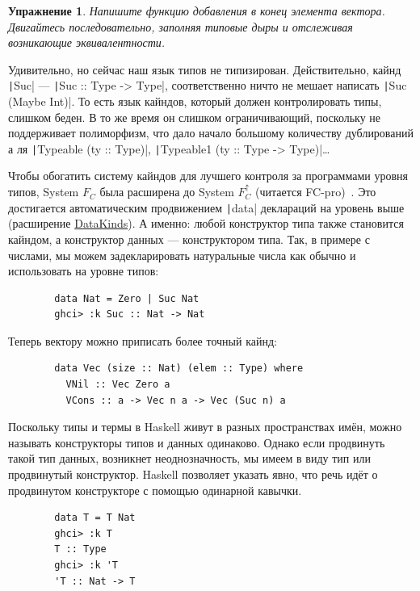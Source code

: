 \documentclass[12pt]{article}
\newtheorem{task}{Упражнение}
\begin{document}
    \begin{task}
        Напишите функцию добавления в конец элемента вектора.
        Двигайтесь последовательно, заполняя типовые дыры и отслеживая возникающие эквивалентности.
    \end{task}

    Удивительно, но сейчас наш язык типов не типизирован.
    Действительно, кайнд \texttt|Suc| --- \texttt|Suc :: Type -> Type|, соответственно ничто не мешает написать \texttt|Suc (Maybe Int)|.
    То есть язык кайндов, который должен контролировать типы, слишком беден.
    В то же время он слишком ограничивающий, поскольку не поддерживает полиморфизм, что дало начало большому количеству дублирований а ля \texttt|Typeable (ty :: Type)|, \texttt|Typeable1 (ty :: Type -> Type)|\ldots

    Чтобы обогатить систему кайндов для лучшего контроля за программами уровня типов, System $F_C$ была расширена до System $F_C^\uparrow$ (читается FC-pro)~\cite{yorgey2012giving}.
    Это достигается автоматическим продвижением \texttt|data| деклараций на уровень выше (расширение \href{https://downloads.haskell.org/ghc/latest/docs/users_guide/exts/data_kinds.html#extension-DataKinds}{DataKinds}).
    А именно: любой конструктор типа также становится кайндом, а конструктор данных --- конструктором типа.
    Так, в примере с числами, мы можем задекларировать натуральные числа как обычно и использовать на уровне типов:
    \begin{verbatim}
        data Nat = Zero | Suc Nat
        ghci> :k Suc :: Nat -> Nat
    \end{verbatim}

    Теперь вектору можно приписать более точный кайнд:
    \begin{verbatim}
        data Vec (size :: Nat) (elem :: Type) where
          VNil :: Vec Zero a
          VCons :: a -> Vec n a -> Vec (Suc n) a
    \end{verbatim}

    Поскольку типы и термы в Haskell живут в разных пространствах имён, можно называть конструкторы типов и данных одинаково.
    Однако если продвинуть такой тип данных, возникнет неоднозначность, мы имеем в виду тип или продвинутый конструктор.
    Haskell позволяет указать явно, что речь идёт о продвинутом конструкторе с помощью одинарной кавычки.
    \begin{verbatim}
        data T = T Nat
        ghci> :k T
        T :: Type
        ghci> :k 'T
        'T :: Nat -> T
    \end{verbatim}
\end{document}
